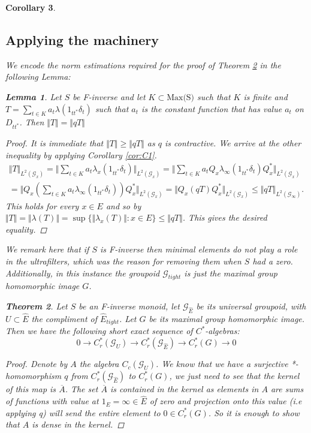 \documentclass[11pt]{amsart}
\theoremstyle{plain}
\newtheorem{theorem}{Theorem}%
\newtheorem{lemma}[theorem]{Lemma}%
\newtheorem{corollary}[theorem]{Corollary}%
\theoremstyle{definition}%
\theoremstyle{remark}%
\newcommand{\G}{\mathcal{G}}
\newcommand{\E}{\widehat{E}}
\begin{document}
\begin{corollary}
\subsection{Applying the machinery}\label{sect:S1-a}
We encode the norm estimations required for the proof of Theorem \ref{thm:PV1} in the following Lemma:
\begin{lemma}\label{lem:L3}
Let $S$ be F-inverse and let $K \subset \text{Max(S)}$ such that $K$ is finite and $T=\sum_{t \in K} a_{t}\lambda(1_{tt^{*}}\delta_{t})$ such that $a_{t}$ is the constant function that has value $a_{t}$ on $D_{tt^{*}}$. Then $\Vert T \Vert = \Vert qT \Vert$
\end{lemma}
\begin{proof}
It is immediate that $\Vert T \Vert \geq \Vert qT \Vert$ as $q$ is contractive. We arrive at the other inequality by applying Corollary \ref{cor:C1}.
\begin{eqnarray*}
\Vert T \Vert_{L^{2}(\mathcal{G}_{x})} = \Vert \sum_{t \in K} a_{t}\lambda_{x}(1_{tt^{*}}\delta_{t}) \Vert_{L^{2}(\mathcal{G}_{x})} = \Vert \sum_{t \in K} a_{t}Q_{x}\lambda_{\infty}(1_{tt^{*}}\delta_{t})Q_{x}^{*} \Vert_{L^{2}(\mathcal{G}_{x})} \\
= \Vert Q_{x}(\sum_{t \in K} a_{t}\lambda_{\infty}(1_{tt^{*}}\delta_{t}))Q_{x}^{*} \Vert_{L^{2}(\mathcal{G}_{x})} = \Vert Q_{x}(qT)Q_{x}^{*} \Vert_{L^{2}(\mathcal{G}_{x})} \leq \Vert qT \Vert_{L^{2}(\mathcal{G}_{\infty})}.
\end{eqnarray*}
This holds for every $x \in E$ and so by  $\Vert T \Vert = \Vert \lambda(T) \Vert = \sup \lbrace \Vert \lambda_{x}(T) \Vert : x \in E \rbrace \leq \Vert qT \Vert$. This gives the desired equality.  
\end{proof}

We remark here that if $S$ is F-inverse then minimal elements do not play a role in the ultrafilters, which was the reason for removing them when $S$ had a zero. Additionally, in this instance the groupoid $\G_{tight}$ is just the maximal group homomorphic image $G$. 

\begin{theorem}\label{thm:PV1}
Let $S$ be an F-inverse monoid, let $\G_{\E}$ be its universal groupoid, with $U \subset \E$ the compliment of $\E_{tight}$. Let $G$ be its maximal group homomorphic image. Then we have the following short exact sequence of $C^{*}$-algebras:
\begin{equation*}
0 \rightarrow C^{*}_{r}(\G_{U}) \rightarrow C^{*}_{r}(\G_{\E}) \rightarrow C^{*}_{r}(G) \rightarrow 0
\end{equation*}
\end{theorem}
\begin{proof}
Denote by $A$ the algebra $C_{c}(\G_{U})$. We know that we have a surjective *-homomorphism $q$ from $C^{*}_{r}(\G_{\E})$ to $C^{*}_{r}(G)$, we just need to see that the kernel of this map is $\overline{A}$. The set $\overline{A}$ is contained in the kernel as elements in $A$ are sums of functions with value at $1_{E}=\infty \in \widehat{E}$ of zero and projection onto this value (i.e applying q) will send the entire element to $0 \in C^{*}_{r}(G)$. So it is enough to show that $A$ is dense in the kernel.


\end{proof}
\end{corollary}
\end{document}
